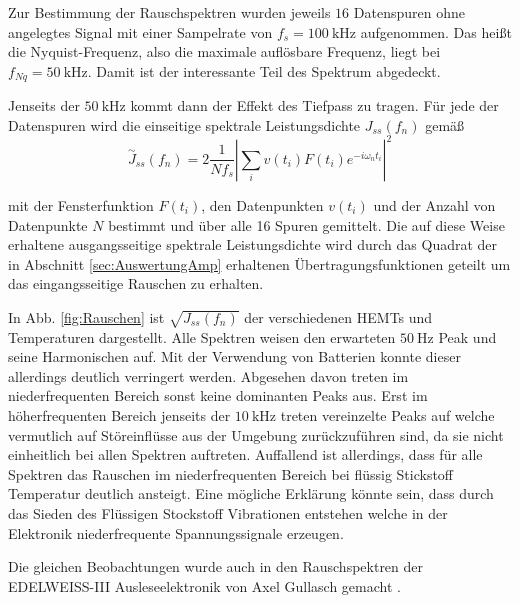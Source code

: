 Zur Bestimmung der Rauschspektren wurden jeweils $16$ Datenspuren ohne angelegtes Signal mit einer Sampelrate von $f_s = \SI{100}{\kilo\hertz}$ aufgenommen.
Das heißt die Nyquist-Frequenz, also die maximale auflösbare Frequenz, liegt bei $f_{Nq}=\SI{50}{\kilo\hertz}$.
Damit ist der interessante Teil des Spektrum abgedeckt.

Jenseits der $\SI{50}{\kilo\hertz}$ kommt dann der Effekt des Tiefpass zu tragen.
Für jede der Datenspuren wird die einseitige spektrale Leistungsdichte $J_{ss}(f_n)$ gemäß
\begin{equation}
\stackrel{\sim}{J}_{ss}(f_n) = 2 \frac{1}{N f_s}\left|\sum_i v(t_i)F(t_i)e^{-i\omega_n t_i}\right|^2
\end{equation}

mit der Fensterfunktion $F(t_i)$, den Datenpunkten $v(t_i)$ und der Anzahl von Datenpunkte $N$ bestimmt und über alle 16 Spuren gemittelt.
Die auf diese Weise erhaltene ausgangsseitige spektrale Leistungsdichte wird durch das Quadrat der in Abschnitt \ref{sec:AuswertungAmp} erhaltenen Übertragungsfunktionen geteilt um das eingangsseitige Rauschen zu erhalten.

In Abb. \ref{fig:Rauschen}  ist $\sqrt{J_{ss}(f_n)}$ der verschiedenen HEMTs und Temperaturen dargestellt.
Alle Spektren weisen den erwarteten $\SI{50}{\hertz}$ Peak und seine Harmonischen auf.
Mit der Verwendung von Batterien konnte dieser allerdings deutlich verringert werden.
Abgesehen davon treten im niederfrequenten Bereich sonst keine dominanten Peaks aus.
Erst im höherfrequenten Bereich jenseits der $\SI{10}{\kilo\hertz}$ treten vereinzelte Peaks auf welche vermutlich auf Störeinflüsse aus der Umgebung zurückzuführen sind, da sie nicht einheitlich bei allen Spektren auftreten.
Auffallend ist allerdings, dass für alle Spektren das Rauschen im niederfrequenten Bereich bei flüssig Stickstoff Temperatur deutlich ansteigt.
Eine mögliche Erklärung könnte sein, dass durch das Sieden des Flüssigen Stockstoff Vibrationen entstehen welche in der Elektronik niederfrequente Spannungssignale erzeugen.

Die gleichen Beobachtungen wurde auch in den Rauschspektren der EDELWEISS-III Ausleseelektronik von Axel Gullasch gemacht \cite{Gullasch2015}.

